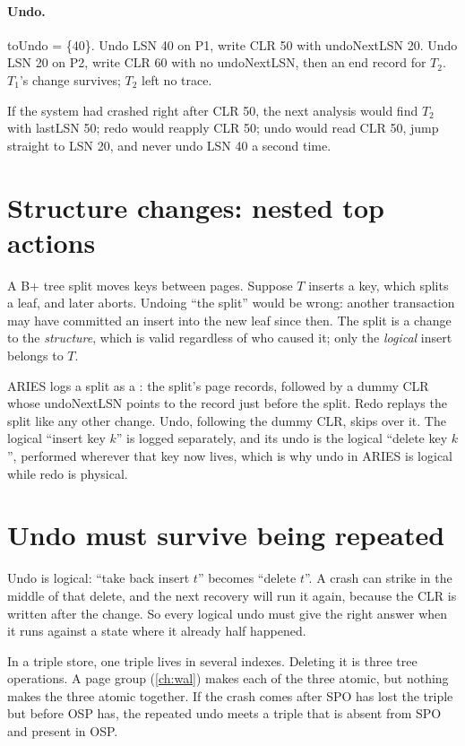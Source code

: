 \paragraph{Undo.} toUndo = \{40\}. Undo LSN 40 on P1, write CLR 50 with
undoNextLSN 20. Undo LSN 20 on P2, write CLR 60 with no undoNextLSN, then an end
record for $T_2$. $T_1$'s change survives; $T_2$ left no trace.

If the system had crashed right after CLR 50, the next analysis would find $T_2$
with lastLSN 50; redo would reapply CLR 50; undo would read CLR 50, jump straight
to LSN 20, and never undo LSN 40 a second time.

\section{Structure changes: nested top actions}

A B+ tree split moves keys between pages. Suppose $T$ inserts a key, which
splits a leaf, and later aborts. Undoing ``the split'' would be wrong: another
transaction may have committed an insert into the new leaf since then. The
split is a change to the \emph{structure}, which is valid regardless of who
caused it; only the \emph{logical} insert belongs to $T$.

ARIES logs a split as a : the split's page records,
followed by a dummy CLR whose undoNextLSN points to the record just before the
split. Redo replays the split like any other change. Undo, following the dummy
CLR, skips over it. The logical ``insert key $k$'' is logged separately, and its
undo is the logical ``delete key $k$'', performed wherever that key now lives,
which is why undo in ARIES is logical while redo is physical.

\section{Undo must survive being repeated}

Undo is logical: ``take back insert $t$'' becomes ``delete $t$''. A crash can
strike in the middle of that delete, and the next recovery will run it again,
because the CLR is written after the change. So every logical undo must give
the right answer when it runs against a state where it already half happened.

In a triple store, one triple lives in several indexes. Deleting it is three
tree operations. A page group (\cref{ch:wal}) makes each of the three atomic,
but nothing makes the three atomic together. If the crash comes after SPO has
lost the triple but before OSP has, the repeated undo meets a triple that is
absent from SPO and present in OSP.

